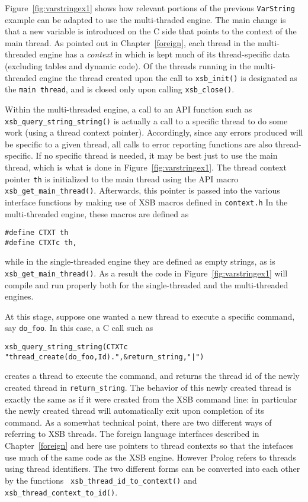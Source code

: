 Figure~\ref{fig:varstringex1} shows how relevant portions of the
previous {\tt VarString} example can be adapted to use the
multi-thraded engine.  The main change is that a new variable is
introduced on the C side that points to the context of the main
thread.  As pointed out in Chapter~\ref{foreign}, each thread in the
multi-threaded engine has a {\em context} in which is kept much of its
thread-specific data (excluding tables and dynamic code).  Of the
threads running in the multi-threaded engine the thread created upon
the call to {\tt xsb\_init()} is designated as the {\tt main thread},
and is closed only upon calling {\tt xsb\_close()}.

Within the multi-threaded engine, a call to an API function such as
{\tt xsb\_query\_string\_string()} is actually a call to a specific
thread to do some work (using a thread context pointer).  Accordingly,
since any errors produced will be specific to a given thread, all
calls to error reporting functions are also thread-specific.  If no
specific thread is needed, it may be best just to use the main thread,
which is what is done in Figure~\ref{fig:varstringex1}.  The thread
context pointer {\tt th} is initialized to the main thread using the
API macro {\tt xsb\_get\_main\_thread()}.  Afterwards, this pointer is
passed into the various interface functions by making use of XSB
macros defined in {\tt context.h} In the multi-threaded engine, these
macros are defined as
%
\begin{verbatim}
#define CTXT th
#define CTXTc th,
\end{verbatim}
%
while in the single-threaded engine they are defined as empty strings,
as is {\tt xsb\_get\_main\_thread()}.  As a result the code in
Figure~\ref{fig:varstringex1} will compile and run properly both for
the single-threaded and the multi-threaded engines.

At this stage, suppose one wanted a new thread to execute a specific
command, say {\tt do\_foo}.  In this case, a C call such as 
%
\begin{verbatim}
xsb_query_string_string(CTXTc "thread_create(do_foo,Id).",&return_string,"|")
\end{verbatim}
creates a thread to execute the command, and returns the thread id of
the newly created thread in {\tt return\_string}.  The behavior of
this newly created thread is exactly the same as if it were created
from the XSB command line: in particular the newly created thread will
automatically exit upon completion of its command.  As a somewhat
technical point, there are two different ways of referring to XSB
threads.  The foreign language interfaces described in
Chapter~\ref{foreign} and here use pointers to thread contexts so that
the intefaces use much of the same code as the XSB engine.  However
Prolog refers to threads using thread identifiers.  The two different
forms can be converted into each other by the functions {\tt
  xsb\_thread\_id\_to\_context()} and {\tt
  xsb\_thread\_context\_to\_id()}.

